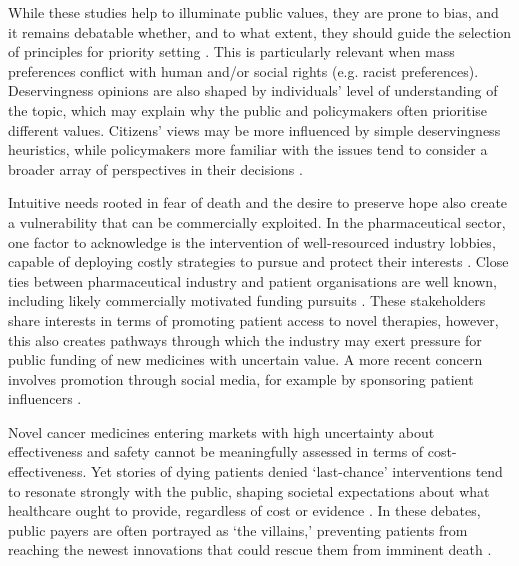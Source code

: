 \documentclass[11pt]{article}\usepackage[]{graphicx}\usepackage[]{xcolor}
\begin{document}
While these studies help to illuminate public values, they are prone to bias, and it remains debatable whether, and to what extent, they should guide the selection of principles for priority setting \parencite{Whitty2014StatedPreferencePrioritySetting, GustavssonLindblom2025JustificationPrinciplesPriority}. This is particularly relevant when mass preferences conflict with human and/or social rights (e.g. racist preferences). Deservingness opinions are also shaped by individuals’ level of understanding of the topic, which may explain why the public and policymakers often prioritise different values. Citizens’ views may be more influenced by simple deservingness heuristics, while policymakers more familiar with the issues tend to consider a broader array of perspectives in their decisions \parencite{Shah2015PrioritySettingExercisesPolicyImplications, VanDerAa2017HealthcareDeservingnessOpinions, JensenPetersen2017DeservingnessHeuristic}.

Intuitive needs rooted in fear of death and the desire to preserve hope also create a vulnerability that can be commercially exploited. In the pharmaceutical sector, one factor to acknowledge is the intervention of well-resourced industry lobbies, capable of deploying costly strategies to pursue and protect their interests \parencite{Greer2016StrengtheningGovernance}. Close ties between pharmaceutical industry and patient organisations are well known, including likely commercially motivated funding pursuits \parencite{Mulinari2020IndustryFundingPatientOrgsSweden, Fabbri2020IndustryFundingPatientOrgs}. These stakeholders share interests in terms of promoting patient access to novel therapies, however, this also creates pathways through which the industry may exert pressure for public funding of new medicines with uncertain value. A more recent concern involves promotion through social media, for example by sponsoring patient influencers \parencite{Mor2024IndustryPromotionSocialMedia}.

Novel cancer medicines entering markets with high uncertainty about effectiveness and safety cannot be meaningfully assessed in terms of cost-effectiveness. Yet stories of dying patients denied ‘last-chance’ interventions tend to resonate strongly with the public, shaping societal expectations about what healthcare ought to provide, regardless of cost or evidence \parencite{PinhoDiasCosta2020MassMediaObstacleRationing, Rubagumya2023MediaCoverageCancerTherapeutics}. In these debates, public payers are often portrayed as ‘the villains,’ preventing patients from reaching the newest innovations that could rescue them from imminent death \parencite{Cohen2017CancerDrugsHighPrice}.
\end{document}
